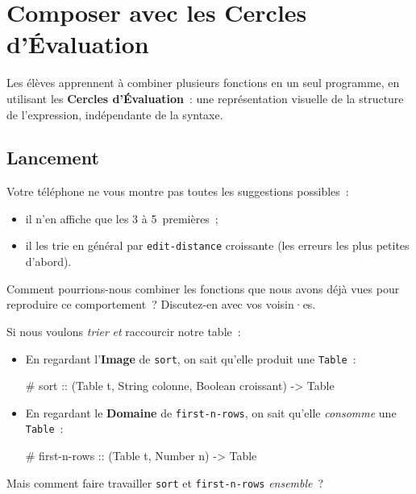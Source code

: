 \documentclass[12pt,a4paper]{article}
\newcommand{\contrat}[1]{%
  \begin{contractbox}
    \ttfamily #1
  \end{contractbox}
}
\begin{document}
\newpage

\section{Composer avec les Cercles d'Évaluation}

\begin{overviewbox}
  Les élèves apprennent à combiner plusieurs fonctions en un seul programme, en utilisant les \textbf{Cercles d'Évaluation}~: une représentation visuelle de la structure de l'expression, indépendante de la syntaxe.
\end{overviewbox}

\subsection{Lancement}

Votre téléphone ne vous montre pas toutes les suggestions possibles~:
\begin{itemize}
  \item il n'en affiche que les 3 à 5~premières~;
  \item il les trie en général par \texttt{edit-distance} croissante (les erreurs les plus petites d'abord).
\end{itemize}

\begin{thinkbox}
  Comment pourrions-nous combiner les fonctions que nous avons déjà vues pour reproduire ce comportement~? Discutez-en avec vos voisin·es.
\end{thinkbox}

Si nous voulons \emph{trier} \emph{et} raccourcir notre table~:
\begin{itemize}
  \item En regardant l'\textbf{Image} de \texttt{sort}, on sait qu'elle produit une \texttt{Table}~:
  \contrat{\# sort :: (Table t, String colonne, Boolean croissant) -> Table}
  \item En regardant le \textbf{Domaine} de \texttt{first-n-rows}, on sait qu'elle \emph{consomme} une \texttt{Table}~:
  \contrat{\# first-n-rows :: (Table t, Number n) -> Table}
\end{itemize}

\noindent Mais comment faire travailler \texttt{sort} et \texttt{first-n-rows} \emph{ensemble}~?
\end{document}
